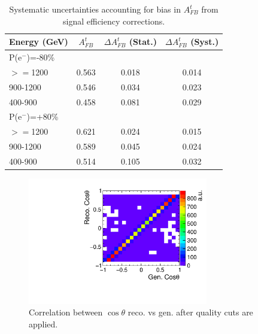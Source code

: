 \begin{table}
  \centering
  \begin{tabular}{l|c|c|c}
    \toprule
    Energy (GeV)& $A_{FB}^t$ & $\Delta A_{FB}^t$  (Stat.) & $\Delta A^t_{FB}$ (Syst.)  \\
    \midrule
    \midrule
    \multicolumn{4}{l}{P(e$^-$)=-80\%} \\
    \midrule
    \midrule
    $>=$1200   & 0.563 & 0.018 & 0.014\\
    \midrule
    900-1200   & 0.546 & 0.034 & 0.023\\
    \midrule
    400-900    & 0.458 & 0.081 & 0.029\\
    \midrule
    \midrule
    \multicolumn{4}{l}{ P(e$^-$)=+80\%}\\
    \midrule
    \midrule
    $>=$1200  & 0.621 & 0.024 & 0.015\\
    \midrule
    900-1200  & 0.589 & 0.045 & 0.024\\
    \midrule
    400-900   & 0.514 & 0.105 & 0.032\\
    \bottomrule
  \end{tabular}
  \caption{Systematic uncertainties accounting for bias in $A_{FB}^t$ from signal efficiency corrections.}
  \label{tab:biassys}
\end{table}

\begin{figure}
  \centering
   \includegraphics[width=0.7\textwidth]{TopAnalysis/figures/CosThetaRecoVsMCFinalBin.pdf}
  \caption[Correlation between $\cos\theta$ reco. vs gen. after quality cuts are applied]{Correlation between $\cos\theta$ reco. vs gen. after quality cuts are applied.}
  \label{fig:binnedqualitycuts}
\end{figure}

